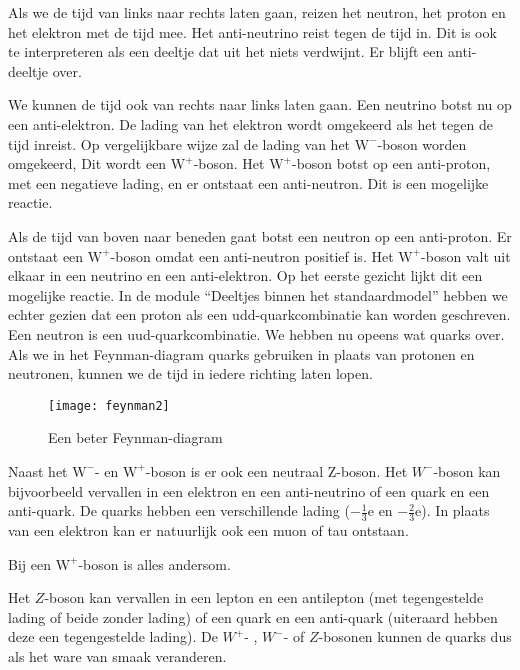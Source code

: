 Als we de tijd van links naar rechts laten gaan, reizen het neutron,
het proton en het elektron met de tijd mee. Het anti-neutrino reist
tegen de tijd in. Dit is ook te interpreteren als een deeltje dat
uit het niets verdwijnt. Er blijft een anti-deeltje over.

We kunnen de tijd ook van rechts naar links laten gaan. Een neutrino
botst nu op een anti-elektron. De lading van het elektron wordt omgekeerd
als het tegen de tijd inreist. Op vergelijkbare wijze zal de lading
van het $\mathrm{W}^{-}$-boson worden omgekeerd, Dit wordt een $\mathrm{W}^{+}$-boson.
Het $\mathrm{W}^{+}$-boson botst op een anti-proton, met een negatieve
lading, en er ontstaat een anti-neutron. Dit is een mogelijke reactie.

Als de tijd van boven naar beneden gaat botst een neutron op een anti-proton.
Er ontstaat een $\mathrm{W}^{+}$-boson omdat een anti-neutron positief
is. Het $\mathrm{W}^{+}$-boson valt uit elkaar in een neutrino en
een anti-elektron. Op het eerste gezicht lijkt dit een mogelijke reactie.
In de module ``Deeltjes binnen het standaardmodel'' hebben we echter
gezien dat een proton als een udd-quarkcombinatie kan worden geschreven.
Een neutron is een uud-quarkcombinatie. We hebben nu opeens wat quarks
over. Als we in het Feynman-diagram quarks gebruiken in plaats van
protonen en neutronen, kunnen we de tijd in iedere richting laten
lopen.

\begin{figure}[H]
\noindent \begin{centering}
\texttt{[image: feynman2]}
\par\end{centering}

\caption{Een beter Feynman-diagram}
\end{figure}
Naast het $\mathrm{W}^{-}$- en $\mathrm{W}^{+}$-boson is er ook
een neutraal $\mathrm{Z}$-boson. Het $W^{-}$-boson kan bijvoorbeeld
vervallen in een elektron en een anti-neutrino of een quark en een
anti-quark. De quarks hebben een verschillende lading ($-\frac{1}{3}\mathrm{e}$
en $-\frac{2}{3}\mathrm{e}$). In plaats van een elektron kan er natuurlijk
ook een muon of tau ontstaan.

Bij een $\mathrm{W}^{+}$-boson is alles andersom. 

Het $Z$-boson kan vervallen in een lepton en een antilepton (met
tegengestelde lading of beide zonder lading) of een quark en een anti-quark
(uiteraard hebben deze een tegengestelde lading). De $W^{+}$- , $W^{-}$-
of $Z$-bosonen kunnen de quarks dus als het ware van smaak veranderen.


